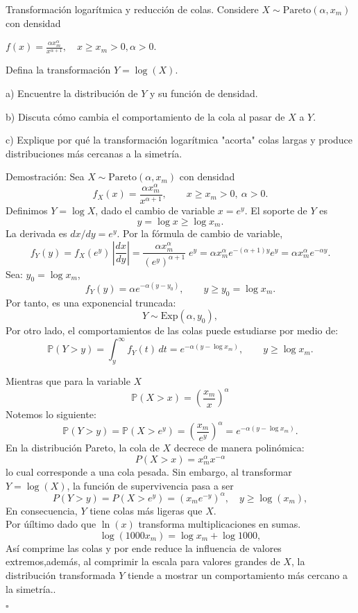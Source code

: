 \documentclass[a4paper,11pt]{article}
\begin{document}
\begin{ejercicio}{9}
    Transformación logarítmica y reducción de colas. Considere $X \sim \text{Pareto}(\alpha, x_m)$
    con densidad

    $f(x) = \frac{\alpha x_m^\alpha}{x^{\alpha+1}}, \quad x \geq x_m > 0, \alpha > 0$.

    Defina la transformación $Y = \log(X)$.

    a) Encuentre la distribución de $Y$ y su función de densidad.

    b) Discuta cómo cambia el comportamiento de la cola al pasar de $X$ a $Y$.

    c) Explique por qué la transformación logarítmica "acorta" colas largas y produce distribuciones más cercanas a la simetría.
\end{ejercicio}\begin{demostracion}{Demostración:}
    Sea \(X\sim\mathrm{Pareto}(\alpha,x_m)\) con densidad
    \[
        f_X(x)=\frac{\alpha x_m^\alpha}{x^{\alpha+1}},\qquad x\ge x_m>0,\ \alpha>0.
    \]
    Definimos \(Y=\log X\), dado el  cambio de variable \(x=e^y\). El soporte de \(Y\) es
    \[
        y=\log x\ge \log x_m.
    \]
    La derivada es \(dx/dy=e^y\). Por la fórmula de cambio de variable,
    \[
        f_Y(y)=f_X(e^y)\,\left|\frac{dx}{dy}\right|
        = \frac{\alpha x_m^\alpha}{(e^y)^{\alpha+1}} \; e^y
        = \alpha x_m^\alpha e^{-(\alpha+1)y} e^{y}
        = \alpha x_m^\alpha e^{-\alpha y}.
    \]
    Sea: \(y_0=\log x_m\),
    \[
        f_Y(y)=\alpha e^{-\alpha (y-y_0)},\qquad y\ge y_0=\log x_m.
    \]
    Por tanto, es una exponencial truncada:
    \[
        Y\sim \mathrm{Exp}(\alpha,y_0),
    \]
    Por otro lado, el comportamientos de las colas puede estudiarse por medio de:
    \[
        \mathbb{P}(Y>y)=\int_y^\infty f_Y(t)\,dt = e^{-\alpha(y-\log x_m)},\qquad y\ge\log x_m.
    \]

    Mientras que para la variable $X$
    \[
        \mathbb{P}(X>x)=\left(\frac{x_m}{x}\right)^{\alpha}
    \]
    Notemos lo siguiente:
    \[
        \mathbb{P}(Y>y)=\mathbb{P}(X>e^y)=\left(\frac{x_m}{e^y}\right)^{\alpha}=e^{-\alpha(y-\log x_m)}.
    \]
    En la distribución Pareto, la cola de $X$ decrece de manera polinómica:
    \[
        P(X > x) = x_m^{\alpha} x^{-\alpha}
    \]
    lo cual corresponde a una cola pesada.
    Sin embargo, al transformar $Y = \log(X)$, la función de supervivencia pasa a ser
    \[
        P(Y > y) = P(X > e^y) = (x_m e^{-y})^{\alpha}, \quad y \geq \log(x_m),
    \]
    En consecuencia, $Y$ tiene colas  más ligeras que $X$. \\
    Por úíltimo dado que  $\ln(x)$ transforma multiplicaciones en sumas.
    \[
        \log(1000 x_m)=\log x_m + \log 1000,
    \]
    Así comprime las colas y por ende reduce la influencia de valores extremos,además, al comprimir la escala para valores grandes de $X$, la distribución transformada $Y$ tiende a mostrar un comportamiento más cercano a la simetría..

    \noindent\(\square\)
\end{demostracion}
\end{document}
